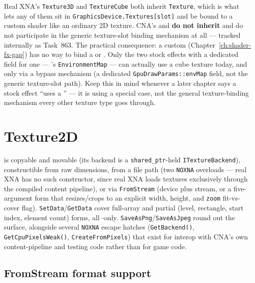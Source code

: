 Real XNA's \texttt{Texture3D} and \texttt{TextureCube} both inherit \texttt{Texture}, which
is what lets any of them sit in \texttt{GraphicsDevice.Textures[slot]} and be bound to a
custom shader like an ordinary 2D texture. CNA's  and
 \textbf{do not inherit}  and do not participate in
the generic texture-slot binding mechanism at all --- tracked internally as Task~863. The
practical consequence: a custom  (Chapter~\ref{ch:shader-fx-gap}) has
no way to bind a  or . Only the two stock effects
with a dedicated field for one --- 's
\texttt{EnvironmentMap} --- can actually use a cube texture today, and only via a bypass
mechanism (a dedicated \texttt{GpuDrawParams::envMap} field, not the generic texture-slot
path). Keep this in mind whenever a later chapter says a stock effect ``uses a
'' --- it is using a special case, not the general texture-binding
mechanism every other texture type goes through.

\section{Texture2D}

 is copyable and movable (its backend is a \texttt{shared\_ptr}-held
\texttt{ITextureBackend}), constructible from raw dimensions, from a file path (two
\texttt{NOXNA} overloads --- real XNA has no such constructor, since real XNA loads textures
exclusively through the compiled content pipeline), or via \texttt{FromStream} (device plus
stream, or a five-argument form that resizes/crops to an explicit width, height, and
\texttt{zoom} fit-vs-cover flag). \texttt{SetData}/\texttt{GetData} cover full-array and
partial (level, rectangle, start index, element count) forms, all -only.
\texttt{SaveAsPng}/\texttt{SaveAsJpeg} round out the surface, alongside several
\texttt{NOXNA} escape hatches (\texttt{GetBackend()}, \texttt{GetCpuPixelsWeak()},
\texttt{CreateFromPixels}) that exist for interop with CNA's own content-pipeline and testing
code rather than for game code.

\subsection{FromStream format support}
\label{sec:texture-streams}


